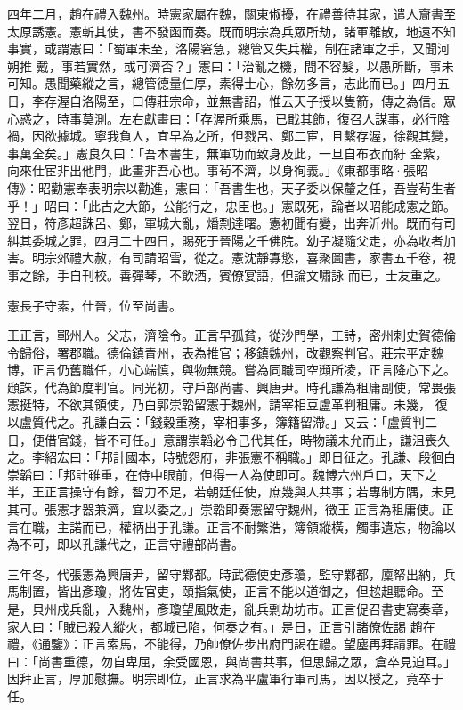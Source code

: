 \begin{pinyinscope}
 四年二月，趙在禮入魏州。時憲家屬在魏，關東俶擾，在禮善待其家，遣人齎書至太原誘憲。憲斬其使，書不發函而奏。既而明宗為兵眾所劫，諸軍離散，地遠不知事實，或謂憲曰：「蜀軍未至，洛陽窘急，總管又失兵權，制在諸軍之手，又聞河朔推
 戴，事若實然，或可濟否？」憲曰：「治亂之機，間不容髮，以愚所斷，事未可知。愚聞藥縱之言，總管德量仁厚，素得士心，餘勿多言，志此而已。」四月五日，李存渥自洛陽至，口傳莊宗命，並無書詔，惟云天子授以隻箭，傳之為信。眾心惑之，時事莫測。左右獻畫曰：「存渥所乘馬，已戢其飾，復召人謀事，必行陰禍，因欲據城。寧我負人，宜早為之所，但戮呂、鄭二宦，且繫存渥，徐觀其變，事萬全矣。」憲良久曰：「吾本書生，無軍功而致身及此，一旦自布衣而紆
 金紫，向來仕宦非出他門，此畫非吾心也。事茍不濟，以身徇義。」《東都事略·張昭傳》：昭勸憲奉表明宗以勸進，憲曰：「吾書生也，天子委以保釐之任，吾豈茍生者乎！」昭曰：「此古之大節，公能行之，忠臣也。」憲既死，論者以昭能成憲之節。翌日，符彥超誅呂、鄭，軍城大亂，燔剽達曙。憲初聞有變，出奔沂州。既而有司糾其委城之罪，四月二十四日，賜死于晉陽之千佛院。幼子凝隨父走，亦為收者加害。明宗郊禮大赦，有司請昭雪，從之。憲沈靜寡慾，喜聚圖書，家書五千卷，視事之餘，手自刊校。善彈琴，不飲酒，賓僚宴語，但論文嘯詠
 而已，士友重之。



 憲長子守素，仕晉，位至尚書。



 王正言，鄆州人。父志，濟陰令。正言早孤貧，從沙門學，工詩，密州刺史賀德倫令歸俗，署郡職。德倫鎮青州，表為推官；移鎮魏州，改觀察判官。莊宗平定魏博，正言仍舊職任，小心端慎，與物無競。嘗為同職司空頲所凌，正言降心下之。頲誅，代為節度判官。同光初，守戶部尚書、興唐尹。時孔謙為租庸副使，常畏張憲挺特，不欲其領使，乃白郭崇韜留憲于魏州，請宰相豆盧革判租庸。未幾，
 復以盧質代之。孔謙白云：「錢穀重務，宰相事多，簿籍留滯。」又云：「盧質判二日，便借官錢，皆不可任。」意謂崇韜必令己代其任，時物議未允而止，謙沮喪久之。李紹宏曰：「邦計國本，時號怨府，非張憲不稱職。」即日征之。孔謙、段徊白崇韜曰：「邦計雖重，在侍中眼前，但得一人為使即可。魏博六州戶口，天下之半，王正言操守有餘，智力不足，若朝廷任使，庶幾與人共事；若專制方隅，未見其可。張憲才器兼濟，宜以委之。」崇韜即奏憲留守魏州，徵王
 正言為租庸使。正言在職，主諾而已，權柄出于孔謙。正言不耐繁浩，簿領縱橫，觸事遺忘，物論以為不可，即以孔謙代之，正言守禮部尚書。



 三年冬，代張憲為興唐尹，留守鄴都。時武德使史彥瓊，監守鄴都，廩帑出納，兵馬制置，皆出彥瓊，將佐官吏，頤指氣使，正言不能以道御之，但趑趄聽命。至是，貝州戍兵亂，入魏州，彥瓊望風敗走，亂兵剽劫坊市。正言促召書吏寫奏章，家人曰：「賊已殺人縱火，都城已陷，何奏之有。」是日，正言引諸僚佐謁
 趙在禮，《通鑒》：正言索馬，不能得，乃帥僚佐步出府門謁在禮。望塵再拜請罪。在禮曰：「尚書重德，勿自卑屈，余受國恩，與尚書共事，但思歸之眾，倉卒見迫耳。」因拜正言，厚加慰撫。明宗即位，正言求為平盧軍行軍司馬，因以授之，竟卒于任。




\end{pinyinscope}

